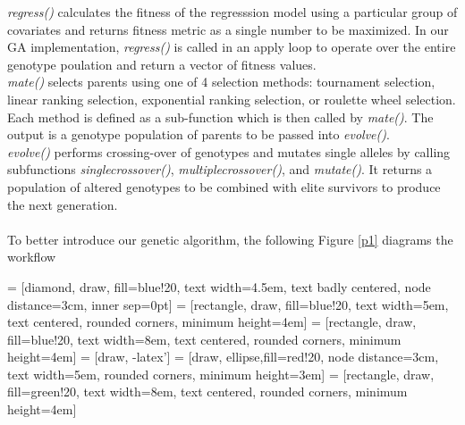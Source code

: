 \documentclass{article}
\begin{document}
\textit{regress()} calculates the fitness of the regresssion model using a particular group of covariates and returns fitness metric as a single number to be maximized. In our GA implementation, \textit{regress()} is called in an apply loop to operate over the entire genotype poulation and return a vector of fitness values.\\

\textit{mate()} selects parents using one of 4 selection methods: tournament selection, linear ranking selection, exponential ranking selection, or roulette wheel selection. Each method is defined as a sub-function which is then called by \textit{mate()}. The output is a genotype population of parents to be passed into \textit{evolve()}.\\

\textit{evolve()} performs crossing-over of genotypes and mutates single alleles by calling subfunctions \textit{singlecrossover()}, \textit{multiplecrossover()}, and \textit{mutate()}. It returns a population of altered genotypes to be combined with elite survivors to produce the next generation.\\
\\
To better introduce our genetic algorithm, the following Figure \ref{p1} diagrams the workflow

\vspace{5mm}

 = [diamond, draw, fill=blue!20,
    text width=4.5em, text badly centered, node distance=3cm, inner sep=0pt]
 = [rectangle, draw, fill=blue!20,
    text width=5em, text centered, rounded corners, minimum height=4em]
 = [rectangle, draw, fill=blue!20,
    text width=8em, text centered, rounded corners, minimum height=4em]
 = [draw, -latex']
 = [draw, ellipse,fill=red!20, node distance=3cm, text width=5em,
    rounded corners, minimum height=3em]
 = [rectangle, draw, fill=green!20,
    text width=8em, text centered, rounded corners, minimum height=4em]
\end{document}
